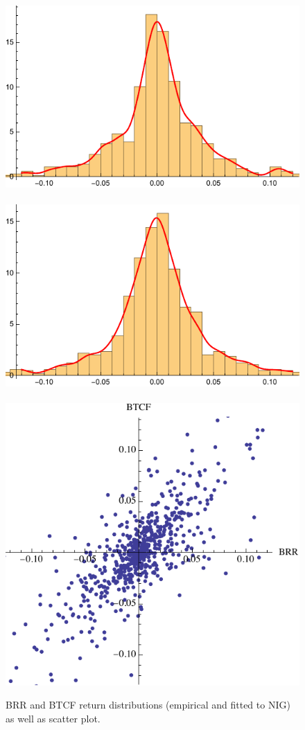 \begin{figure}[t]
  \centering
  \includegraphics[scale=.55]{_pics/rbrr.pdf} \ \ 
  \includegraphics[scale=.55]{_pics/rbtc.pdf}\ \ 
  \includegraphics[scale=.4]{_pics/scatter.pdf}
  \caption{BRR and BTCF return distributions (empirical and fitted to
    NIG) as well as scatter plot.}
  \label{fig:nig}
\end{figure}

